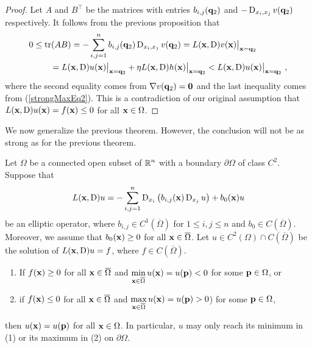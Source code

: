 \begin{proof}
Let $A$ and $\displaystyle B^\top$ be the matrices with entries
$b_{i,j}(\mathbf{q}_2)$ and $-\operatorname{D}_{x_i,x_j} v(\mathbf{q}_2)$ respectively.
It follows from the previous proposition that
\begin{align*}
0 &\leq \operatorname{tr}(AB)
= - \sum_{i,j=1}^n b_{i,j}(\mathbf{q}_2) \operatorname{D}_{x_i,x_j} v(\mathbf{q}_2)
= L(\mathbf{x},\operatorname{D}) v(\mathbf{x})\big|_{\mathbf{x} = \mathbf{q}_2} \\
&\qquad = L(\mathbf{x},\operatorname{D}) u(\mathbf{x})\big|_{\mathbf{x} = \mathbf{q}_2}
+ \eta L(\mathbf{x},\operatorname{D}) h(\mathbf{x})\big|_{\mathbf{x} = \mathbf{q}_2}
< L(\mathbf{x},\operatorname{D}) u(\mathbf{x})\big|_{\mathbf{x} = \mathbf{q}_2} \ ,
\end{align*}
where the second equality comes from $\nabla v(\mathbf{q}_2) = \mathbf{0}$
and the last inequality comes from (\ref{strongMaxEq2}).  This is a
contradiction of our original assumption that
$L(\mathbf{x},\operatorname{D}) u(\mathbf{x}) = f(\mathbf{x}) \leq 0$ for all $\mathbf{x} \in \Omega$.
\end{proof}


We now generalize the previous theorem.  However, the conclusion will
not be as strong as for the previous theorem.

\begin{theorem} \label{ellStrongMaxB}
Let $\Omega$ be a connected open subset of $\displaystyle \mathbb{R}^n$ with
a boundary $\partial \Omega$ of class $\displaystyle C^2$.  Suppose that
\[
L(\mathbf{x},\operatorname{D})u = - \sum_{i,j=1}^n
\operatorname{D}_{x_i} \left( b_{i,j}(\mathbf{x}) \operatorname{D}_{x_j} u \right) + b_0(\mathbf{x}) u
\]
be an elliptic operator, where
$\displaystyle b_{i,j} \in C^1(\overline{\Omega})$
for $1 \leq i,j\leq n$ and $b_0 \in C(\overline{\Omega})$.
Moreover, we assume that $b_0(\mathbf{x}) \geq 0$ for all
$\mathbf{x} \in \overline{\Omega}$.
Let $\displaystyle u \in C^2(\Omega) \cap C(\overline{\Omega})$ be the
solution of $L(\mathbf{x},\operatorname{D})u = f$, where $f \in C(\overline{\Omega})$.
\begin{enumerate}
\item If $f(\mathbf{x}) \geq 0$ for all $\mathbf{x} \in \overline{\Omega}$ and
$\displaystyle \min_{\mathbf{x}\in \overline{\Omega}} u(\mathbf{x}) = u(\mathbf{p}) < 0$
for some $\mathbf{p} \in \Omega$, or
\item if $f(\mathbf{x}) \leq 0$ for all $\mathbf{x} \in \overline{\Omega}$ and
$\displaystyle \max_{\mathbf{x}\in \overline{\Omega}} u(\mathbf{x}) = u(\mathbf{p}) > 0$)
for some $\mathbf{p} \in \Omega$,
\end{enumerate}
then $u(\mathbf{x})= u(\mathbf{p})$ for all $\mathbf{x} \in \Omega$.  In
particular, $u$ may only reach its minimum in (1) or its maximum in
(2) on $\partial \Omega$.
\end{theorem}

